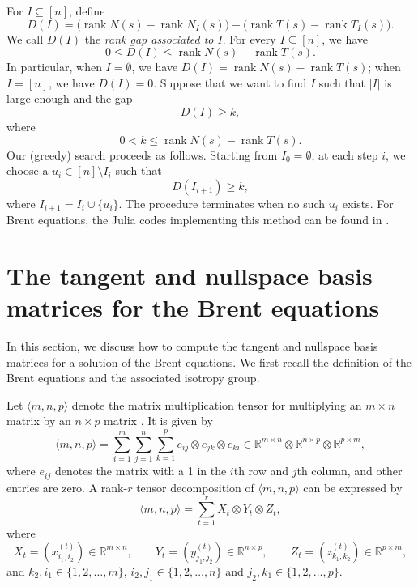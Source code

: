 \documentclass[reqno]{amsart}
\theoremstyle{definition}
\numberwithin{equation}{section}
\theoremstyle{remark}
\begin{document}
For $I\subseteq[n]$, define
\begin{equation}\label{eq-DI}
D(I)=
\bigl(\operatorname{rank}N(s)-\operatorname{rank}N_I(s)\bigr)
-\bigl(\operatorname{rank}T(s)-\operatorname{rank}T_I(s)\bigr).
\end{equation}
We call $D(I)$ the \emph{rank gap associated to $I$}. For every
$I\subseteq[n]$, we have
$$0\leq D(I)\leq
\operatorname{rank}N(s)-\operatorname{rank}T(s).$$
In particular, when $I=\emptyset$, we have 
$D(I)=\operatorname{rank}N(s)-\operatorname{rank}T(s)$; when $I=[n]$, we have $D(I)=0$. Suppose that we want to find $I$ such that $|I|$ is large enough and the gap 
$$D(I)\geq k,$$
where
$$0<k\leq \operatorname{rank}N(s)-\operatorname{rank}T(s).$$
Our (greedy) search proceeds as follows. Starting from
$I_0=\emptyset$, at each step $i$, we choose a
$u_i\in [n]\setminus I_i$ such that 
$$D(I_{i+1})\geq k,$$
where $I_{i+1}=I_i\cup\{u_i\}$.
The procedure terminates when no such  $u_i$ exists.
For Brent equations, the Julia codes implementing this method can be found in \cite{L-23}.

\section{The tangent and nullspace basis matrices for the Brent equations}
\label{sec-tnsbe}

In this section, we discuss how to compute the tangent and nullspace basis matrices for a solution of the Brent equations. We first recall the definition of the Brent equations and the associated isotropy group.

Let  $\langle m,n,p\rangle$ denote the matrix multiplication tensor
for multiplying an $m\times n$ matrix by an $n\times p$ matrix \cite{Bur15,dumas26,Lan17}. It is given by
$$
\langle m,n,p\rangle
=\sum_{i=1}^{m}\sum_{j=1}^{n}\sum_{k=1}^{p}e_{ij}\otimes e_{jk}\otimes e_{ki}\in \mathbb{R}^{m\times n}\otimes\mathbb{R}^{n\times p}\otimes\mathbb{R}^{p\times m},
$$
where $e_{ij}$ denotes the matrix with a 1 in the $i$th row and $j$th column, and other entries are zero. 
A rank-$r$ tensor decomposition of $\langle m,n,p\rangle$ can be expressed by
\begin{equation}\label{eq-mnpr}
\langle m,n,p\rangle
=\sum_{t=1}^{r} X_{t}\otimes Y_{t}\otimes Z_{t},  
\end{equation}
where
\begin{equation}\label{eq-brentxyz}
X_{t}=\left(x^{(t)}_{i_1,i_2}\right)\in \mathbb{R}^{m\times n},\qquad
Y_{t}=\left(y^{(t)}_{j_1,j_2}\right)\in \mathbb{R}^{n\times p},\qquad
Z_{t}=\left(z^{(t)}_{k_1,k_2}\right)\in \mathbb{R}^{p\times m},
\end{equation}
and $k_2,i_1\in \{1,2,\dots,m\}$, $i_2,j_1\in\{1,2,\dots,n\}$ and
$j_2,k_1\in\{1,2,\dots,p\}$.
\end{document}
